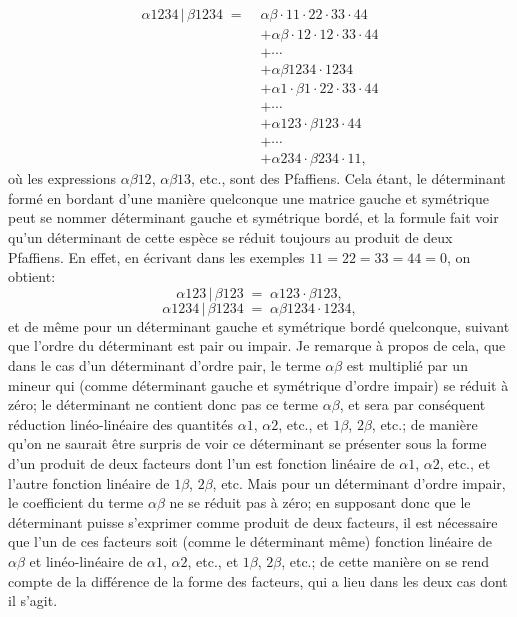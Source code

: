 \documentclass[11pt,a4paper]{article}
\begin{document}
\setcounter{page}{73}

\begin{align*}
\alpha1234\,|\,\beta1234 \;=\;
&\alpha\beta \cdot 11\cdot 22\cdot 33\cdot 44 \\
&+ \alpha\beta \cdot 12\cdot 12\cdot 33\cdot 44 \\
&+ \cdots \\
&+ \alpha\beta1234 \cdot 1234 \\
&+ \alpha1 \cdot \beta1 \cdot 22\cdot 33\cdot 44 \\
&+ \cdots \\
&+ \alpha123 \cdot \beta123 \cdot 44 \\
&+ \cdots \\
&+ \alpha234 \cdot \beta234 \cdot 11,
\end{align*}
o\`u les expressions $\alpha\beta12$, $\alpha\beta13$, etc., sont des
Pfaffiens. Cela \'etant, le d\'eterminant form\'e en bordant d'une mani\`ere
quelconque une matrice gauche et sym\'etrique peut se nommer d\'eterminant gauche
et sym\'etrique bord\'e, et la formule fait voir qu'un d\'eterminant de cette
esp\`ece se r\'eduit toujours au produit de deux Pfaffiens. En effet, en \'ecrivant
dans les exemples $11 = 22 = 33 = 44 = 0$, on obtient:
\[
\alpha123\,|\,\beta123 \;=\; \alpha123 \cdot \beta123,
\]
\[
\alpha1234\,|\,\beta1234 \;=\; \alpha\beta1234 \cdot 1234,
\]
et de m\^eme pour un d\'eterminant gauche et sym\'etrique bord\'e quelconque,
suivant que l'ordre du d\'eterminant est pair ou impair. Je remarque \`a propos
de cela, que dans le cas d'un d\'eterminant d'ordre pair, le terme $\alpha\beta$
est multipli\'e par un mineur qui (comme d\'eterminant gauche et sym\'etrique
d'ordre impair) se r\'eduit \`a z\'ero; le d\'eterminant ne contient donc pas ce
terme $\alpha\beta$, et sera par cons\'equent r\'eduction lin\'eo-lin\'eaire des
quantit\'es $\alpha 1$, $\alpha 2$, etc., et $1\beta$, $2\beta$, etc.; de mani\`ere
qu'on ne saurait \^etre surpris de voir ce d\'eterminant se pr\'esenter sous la
forme d'un produit de deux facteurs dont l'un est fonction lin\'eaire de $\alpha 1$,
$\alpha 2$, etc., et l'autre fonction lin\'eaire de $1\beta$, $2\beta$, etc. Mais
pour un d\'eterminant d'ordre impair, le coefficient du terme $\alpha\beta$ ne se
r\'eduit pas \`a z\'ero; en supposant donc que le d\'eterminant puisse s'exprimer
comme produit de deux facteurs, il est n\'ecessaire que l'un de ces facteurs soit
(comme le d\'eterminant m\^eme) fonction lin\'eaire de $\alpha\beta$ et
lin\'eo-lin\'eaire de $\alpha 1$, $\alpha 2$, etc., et $1\beta$, $2\beta$, etc.;
de cette mani\`ere on se rend compte de la diff\'erence de la forme des facteurs,
qui a lieu dans les deux cas dont il s'agit.
\end{document}
